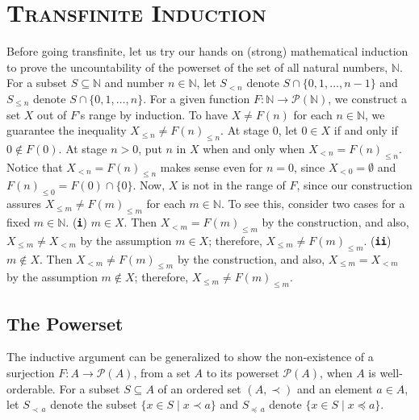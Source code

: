 \documentclass[12pt]{article}
\begin{document}
\section{\textsc{Transfinite Induction}}
Before going transfinite, let us try our hands on (strong) mathematical induction to prove the uncountability of the powerset of the set of all natural numbers, $\mathbb{N}$.
For a subset $S\subseteq\mathbb{N}$ and  number $n\in\mathbb{N}$, let $S_{<n}$ denote $S\cap\{0,1,\dots,n-1\}$ and $S_{\leqslant n}$ denote $S\cap\{0,1,\dots,n\}$.
For a given function $F\colon\mathbb{N}\rightarrow\mathscr{P}(\mathbb{N})$, we construct a set $X$ out of $F$'s range by induction.
To have $X\neq F(n)$ for each $n\in\mathbb{N}$, we guarantee the inequality $X_{\leqslant n}\neq F(n)_{\leqslant n}$.
At stage $0$, let $0\in X$ if and only if $0\not\in F(0)$. At stage $n>0$, put $n$ in $X$ when and only when  $X_{<n}=F(n)_{\leqslant n}$. Notice that $X_{<n}=F(n)_{\leqslant n}$ makes sense even for $n=0$, since $X_{<0}=\emptyset$ and $F(n)_{\leqslant 0}=F(0)\cap\{0\}$. Now, $X$ is not in the range of $F$, since our construction assures   $X_{\leqslant m}\neq F(m)_{\leqslant m}$ for each  $m\in\mathbb{N}$. To see this, consider two cases for a fixed $m\in\mathbb{N}$. (\texttt{\textbf{i}}) $m\in X$. Then $X_{<m} = F(m)_{\leqslant m}$ by the construction, and also, $X_{\leqslant m}\neq X_{<m}$ by the assumption $m\in X$; therefore, $X_{\leqslant m}\neq F(m)_{\leqslant m}$.  (\texttt{\textbf{i\!i}}) $m\not\in X$. Then $X_{<m}\neq F(m)_{\leqslant m}$ by the construction, and also, $X_{\leqslant m}=X_{<m}$ by the assumption $m\not\in X$; therefore, $X_{\leqslant m}\neq F(m)_{\leqslant m}$.



\subsection{The Powerset}
The inductive argument can be generalized to show the non-existence of a surjection $F\colon A\rightarrow\mathscr{P}(A)$, from a set $A$ to its powerset $\mathscr{P}(A)$, when $A$ is well-orderable.
For a subset $S\subseteq A$ of an ordered set $(A,\prec)$ and an element $a\in A$, let $S_{\prec\,a}$ denote the subset  $\{x\in S\mid x\prec a\}$ and $S_{\preccurlyeq\,a}$ denote
 $\{x\in S\mid x\preccurlyeq a\}$.
\end{document}
